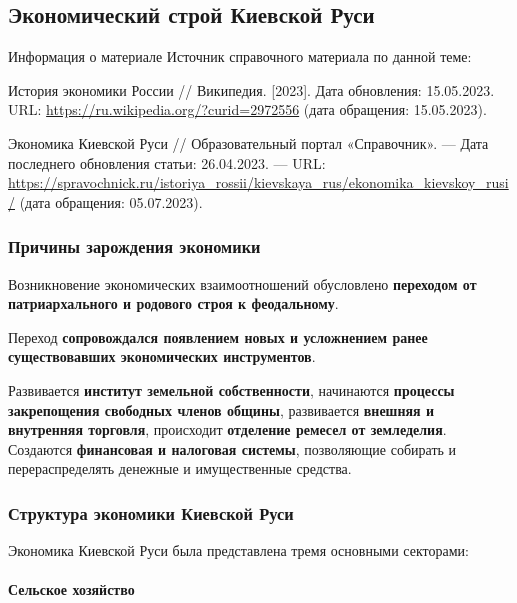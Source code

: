 \documentclass{article}
\begin{document}
\subsection{Экономический строй Киевской Руси}

\begin{bclogo}[logo=\bcinfo, couleurBarre=orange, noborder=true, couleur=white]{Информация о материале}
    Источник справочного материала по данной теме:

    История экономики России // Википедия. [2023]. Дата обновления: 15.05.2023. URL: \url{https://ru.wikipedia.org/?curid=2972556} (дата обращения: 15.05.2023).

    Экономика Киевской Руси // Образовательный портал «Справочник». — Дата последнего обновления статьи: 26.04.2023. — URL: \url{https://spravochnick.ru/istoriya_rossii/kievskaya_rus/ekonomika_kievskoy_rusi/} (дата обращения: 05.07.2023).
\end{bclogo}

\subsubsection{Причины зарождения экономики}

Возникновение экономических взаимоотношений обусловлено \textbf{переходом от патриархального и родового строя к феодальному}.

Переход \textbf{сопровождался появлением новых и усложнением ранее существовавших экономических инструментов}. 

Развивается \textbf{институт земельной собственности}, начинаются \textbf{процессы закрепощения свободных членов общины}, развивается \textbf{внешняя и внутренняя торговля}, происходит \textbf{отделение ремесел от земледелия}. Создаются \textbf{финансовая и налоговая системы}, позволяющие собирать и перераспределять денежные и имущественные средства.

\subsubsection{Структура экономики Киевской Руси}

Экономика Киевской Руси была представлена тремя основными секторами:

\begin{multienumerate}
\end{multienumerate}

\paragraph{Сельское хозяйство}
\end{document}
